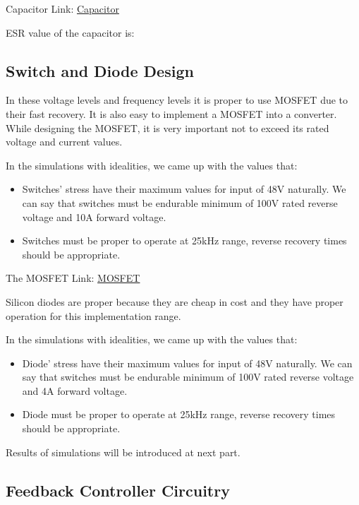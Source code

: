 Capacitor Link: \href{https://product.tdk.com/info/en/documents/chara_sheet/C3216JB1E336M160AC.pdf}{Capacitor}

ESR value of the capacitor is: 


\subsection{Switch and Diode Design}

In these voltage levels and frequency levels it is proper to use MOSFET due to their fast recovery. It is also easy to implement a MOSFET into a converter. While designing the MOSFET, it is very important not to exceed its rated voltage and current values.

In the simulations with idealities, we came up with the values that:

\begin{itemize}
    \item Switches' stress have their maximum values for input of 48V naturally. We can say that switches must be endurable minimum of 100V rated reverse voltage and 10A forward voltage.
    \item Switches must be proper to operate at 25kHz range, reverse recovery times should be appropriate.
\end{itemize}

The MOSFET Link: \href{https://www.digikey.com/product-detail/en/on-semiconductor/FDMS86255/FDMS86255TR-ND/4555505}{MOSFET}



Silicon diodes are proper because they are cheap in cost and they have proper operation for this implementation range. 

In the simulations with idealities, we came up with the values that:

\begin{itemize}
    \item Diode' stress have their maximum values for input of 48V naturally. We can say that switches must be endurable minimum of 100V rated reverse voltage and 4A forward voltage.
    \item Diode must be proper to operate at 25kHz range, reverse recovery times should be appropriate.
\end{itemize}

Results of simulations will be introduced at next part.

\subsection{Feedback Controller Circuitry}

